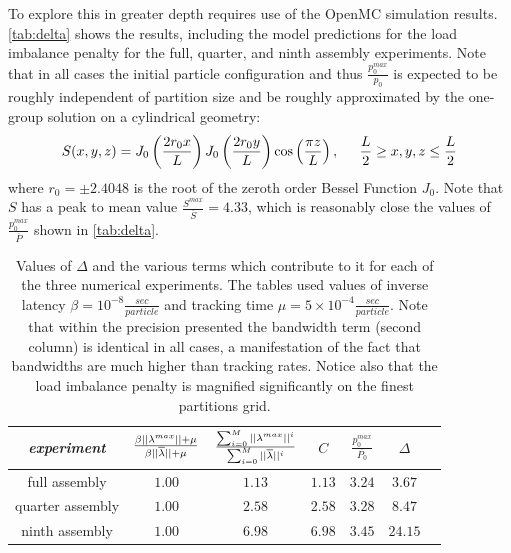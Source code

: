 To explore this in greater depth requires use of the OpenMC simulation
results. \autoref{tab:delta} shows the results, including the model predictions
for the load imbalance penalty for the full, quarter, and ninth assembly
experiments. Note that in all cases the initial particle configuration and thus
$\frac{p_0^{max}}{p_0}$ is expected to be roughly independent of partition size
and be roughly approximated by the one-group solution on a cylindrical
geometry: \[ S(x,y,z) = J_0\left(\frac{2 r_0 x}{L}\right) J_0\left(\frac{2 r_0
  y}{L}\right) \cos\left( \frac{\pi z}{L}\right), \hspace{.2in} \frac{L}{2} \ge
x,y,z \le \frac{L}{2} \] where $r_0=\pm 2.4048$ is the root of the zeroth order
Bessel Function $J_0$. Note that $S$ has a peak to mean value
$\frac{S^{max}}{\overline{S}} = 4.33$, which is reasonably close the values of
$\frac{p_0^{max}}{\overline{P}}$ shown in \autoref{tab:delta}.

\begin{table}
  \centering
  \begin{tabular}{c c c c c c c}
    \toprule
    \emph{experiment} & $\frac{\beta ||\lambda^{max}|| + \mu}{\beta ||\overline{\lambda}|| + \mu}$ & $\frac{\sum_{i=0}^M ||{\lambda^{max}}||^i}{\sum_{i=0}^M ||\overline{\lambda}||^i}$ & $C$ &
    $\frac{p_0^{max}}{\overline{P_0}}$ & $\Delta$ \\
    \midrule
    full assembly & $1.00$ & $1.13$ & $1.13$ & $3.24$ & $3.67$\\
    quarter assembly & $1.00$ & $2.58$ & $2.58$ & $3.28$ & $8.47$\\
    ninth assembly & $1.00$ & $6.98$ & $6.98$ & $3.45$ & $24.15$\\
    \bottomrule
  \end{tabular}
  \caption{Values of $\Delta$ and the various terms which contribute to it for
    each of the three numerical experiments. The tables used values of inverse
    latency $\beta = 10^{-8} \frac{sec}{particle}$ and tracking time $\mu =
    5\times10^{-4} \frac{sec}{particle}$. Note that within the precision presented
    the bandwidth term (second column) is identical in all cases, a manifestation
    of the fact that bandwidths are much higher than tracking rates. Notice also
    that the load imbalance penalty is magnified significantly on the finest
    partitions grid.}
  \label{tab:delta}
\end{table}

